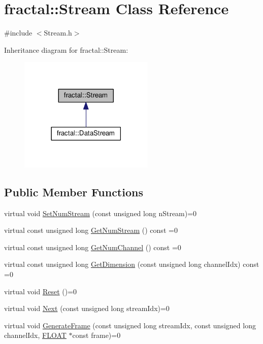 \hypertarget{classfractal_1_1Stream}{\section{fractal\+:\+:Stream Class Reference}
\label{classfractal_1_1Stream}
}


{\ttfamily \#include $<$Stream.\+h$>$}



Inheritance diagram for fractal\+:\+:Stream\+:\nopagebreak
\begin{figure}[H]
\begin{center}
\leavevmode
\includegraphics[width=182pt]{d7/d57/classfractal_1_1Stream__inherit__graph}
\end{center}
\end{figure}
\subsection*{Public Member Functions}
\begin{DoxyCompactItemize}
\item 
virtual void \hyperlink{classfractal_1_1Stream_a9e4e5f26db5d1342426d646ad1c98000}{Set\+Num\+Stream} (const unsigned long n\+Stream)=0
\item 
virtual const unsigned long \hyperlink{classfractal_1_1Stream_aebff003544eb56f37de1b82a7b7d9fe0}{Get\+Num\+Stream} () const =0
\item 
virtual const unsigned long \hyperlink{classfractal_1_1Stream_a599bdaf1050788a560802d1e7abfd5b9}{Get\+Num\+Channel} () const =0
\item 
virtual const unsigned long \hyperlink{classfractal_1_1Stream_a8159e43996cb2ab25f48c02492028544}{Get\+Dimension} (const unsigned long channel\+Idx) const =0
\item 
virtual void \hyperlink{classfractal_1_1Stream_a0d31428cf827092ade973edf9c7fe340}{Reset} ()=0
\item 
virtual void \hyperlink{classfractal_1_1Stream_a059cd85c6b775acb36b273bfab57e6a1}{Next} (const unsigned long stream\+Idx)=0
\item 
virtual void \hyperlink{classfractal_1_1Stream_abd510f6e3f432c3af530f94bf509a177}{Generate\+Frame} (const unsigned long stream\+Idx, const unsigned long channel\+Idx, \hyperlink{namespacefractal_a1c2d2530689575d5ccb56bae52af70d3}{F\+L\+O\+A\+T} $\ast$const frame)=0
\end{DoxyCompactItemize}


